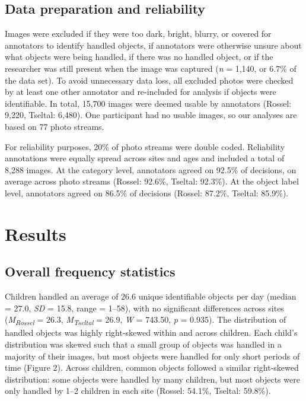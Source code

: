 \documentclass[10pt, letterpaper]{article}
\begin{document}
\hypertarget{data-preparation-and-reliability}{%
\subsection{Data preparation and
reliability}\label{data-preparation-and-reliability}}

Images were excluded if they were too dark, bright, blurry, or covered
for annotators to identify handled objects, if annotators were otherwise
unsure about what objects were being handled, if there was no handled
object, or if the researcher was still present when the image was
captured (\emph{n} = 1,140, or 6.7\% of the data set). To avoid
unnecessary data loss, all excluded photos were checked by at least one
other annotator and re-included for analysis if objects were
identifiable. In total, 15,700 images were deemed usable by annotators
(Rossel: 9,220, Tseltal: 6,480). One participant had no usable images,
so our analyses are based on 77 photo streams.

For reliability purposes, 20\% of photo streams were double coded.
Reliability annotations were equally spread across sites and ages and
included a total of 8,288 images. At the category level, annotators
agreed on 92.5\% of decisions, on average across photo streams (Rossel:
92.6\%, Tseltal: 92.3\%). At the object label level, annotators agreed
on 86.5\% of decisions (Rossel: 87.2\%, Tseltal: 85.9\%).

\hypertarget{results}{%
\section{Results}\label{results}}

\hypertarget{overall-frequency-statistics}{%
\subsection{Overall frequency
statistics}\label{overall-frequency-statistics}}

Children handled an average of 26.6 unique identifiable objects per day
(median = 27.0, \emph{SD} = 15.8, range = 1--58), with no significant
differences across sites (\emph{M}\textsubscript{\emph{Rossel}} = 26.3,
\emph{M}\textsubscript{\emph{Tseltal}} = 26.9, \emph{W} = 743.50,
\emph{p} = 0.935). The distribution of handled objects was highly
right-skewed within and across children. Each child's distribution was
skewed such that a small group of objects was handled in a majority of
their images, but most objects were handled for only short periods of
time (Figure 2). Across children, common objects followed a similar
right-skewed distribution: some objects were handled by many children,
but most objects were only handled by 1--2 children in each site
(Rossel: 54.1\%, Tseltal: 59.8\%).
\end{document}

